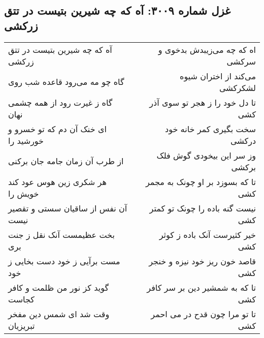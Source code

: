 \begin{center}
\section*{غزل شماره ۳۰۰۹: آه که چه شیرین بتیست در تتق زرکشی}
\label{sec:3009}
\begin{longtable}{l p{0.5cm} r}
آه که چه شیرین بتیست در تتق زرکشی
&&
اه که چه می‌زیبدش بدخوی و سرکشی
\\
گاه چو مه می‌رود قاعده شب روی
&&
می‌کند از اختران شیوه لشکرکشی
\\
گاه ز غیرت رود از همه چشمی نهان
&&
تا دل خود را ز هجر تو سوی آذر کشی
\\
ای خنک آن دم که تو خسرو و خورشید را
&&
سخت بگیری کمر خانه خود درکشی
\\
از طرب آن زمان جامه جان برکنی
&&
وز سر این بیخودی گوش فلک برکشی
\\
هر شکری زین هوس عود کند خویش را
&&
تا که بسوزد بر او چونک به مجمر کشی
\\
آن نفس از ساقیان سستی و تقصیر نیست
&&
نیست گنه باده را چونک تو کمتر کشی
\\
بخت عظیمست آنک نقل ز جنت بری
&&
خیر کثیرست آنک باده ز کوثر کشی
\\
مست برآیی ز خود دست بخایی ز خود
&&
قاصد خون ریز خود نیزه و خنجر کشی
\\
گوید کز نور من ظلمت و کافر کجاست
&&
تا که به شمشیر دین بر سر کافر کشی
\\
وقت شد ای شمس دین مفخر تبریزیان
&&
تا تو مرا چون قدح در می احمر کشی
\\
\end{longtable}
\end{center}
